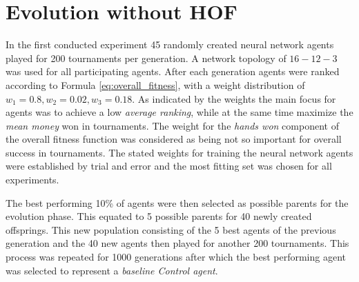 \section{Evolution without HOF}
In the first conducted experiment 45 randomly created neural network agents played for 200 tournaments per generation. A network topology of \textbf{$16-12-3$} was used for all participating agents. After each generation agents were ranked according to Formula \ref{eq:overall_fitness}, with a weight distribution of $w_1 = 0.8, w_2 = 0.02, w_3 = 0.18$. As indicated by the weights the main focus for agents was to achieve a low \textit{average ranking}, while at the same time maximize the \textit{mean money} won in tournaments. The weight for the \textit{hands won} component of the overall fitness function was considered as being not so important for overall success in tournaments. The stated weights for training the neural network agents were established by trial and error and the most fitting set was chosen for all experiments.\par
The best performing 10\% of agents were then selected as possible parents for the evolution phase. This equated to 5 possible parents for 40 newly created offsprings. This new population consisting of the 5 best agents of the previous generation and the 40 new agents then played for another 200 tournaments. This process was repeated for 1000 generations after which the best performing agent was selected to represent a \textit{baseline Control agent}. \par
